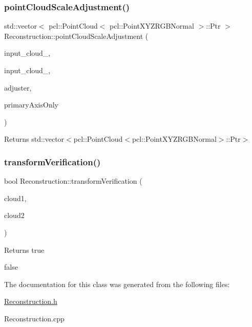 \subsubsection{\texorpdfstring{point\+Cloud\+Scale\+Adjustment()}{pointCloudScaleAdjustment()}}
{\footnotesize\ttfamily std\+::vector$<$ pcl\+::\+Point\+Cloud$<$ pcl\+::\+Point\+X\+Y\+Z\+R\+G\+B\+Normal $>$\+::Ptr $>$ Reconstruction\+::point\+Cloud\+Scale\+Adjustment (\begin{DoxyParamCaption}\item[{pcl\+::\+Point\+Cloud$<$ pcl\+::\+Point\+X\+Y\+Z\+R\+G\+B\+Normal $>$\+::Ptr \&}]{input\+\_\+cloud\+\_,  }\item[{pcl\+::\+Point\+Cloud$<$ pcl\+::\+Point\+X\+Y\+Z\+R\+G\+B\+Normal $>$\+::Ptr \&}]{input\+\_\+cloud\+\_,  }\item[{bool}]{adjuster,  }\item[{bool}]{primary\+Axis\+Only }\end{DoxyParamCaption})}

\begin{DoxyReturn}{Returns}
std\+::vector$<$pcl\+::\+Point\+Cloud$<$pcl\+::\+Point\+X\+Y\+Z\+R\+G\+B\+Normal$>$\+::\+Ptr$>$ 
\end{DoxyReturn}
\mbox{\label{classReconstruction_a73c384d0419386505e5fe58a55b556c9}} 
\subsubsection{\texorpdfstring{transform\+Verification()}{transformVerification()}}
{\footnotesize\ttfamily bool Reconstruction\+::transform\+Verification (\begin{DoxyParamCaption}\item[{pcl\+::\+Point\+Cloud$<$ pcl\+::\+Point\+X\+Y\+Z\+R\+G\+B\+Normal $>$\+::Ptr \&}]{cloud1,  }\item[{pcl\+::\+Point\+Cloud$<$ pcl\+::\+Point\+X\+Y\+Z\+R\+G\+B\+Normal $>$\+::Ptr \&}]{cloud2 }\end{DoxyParamCaption})}

\begin{DoxyReturn}{Returns}
true 

false 
\end{DoxyReturn}


The documentation for this class was generated from the following files\+:\begin{DoxyCompactItemize}
\item 
\hyperlink{Reconstruction_8h}{Reconstruction.\+h}\item 
Reconstruction.\+cpp\end{DoxyCompactItemize}
